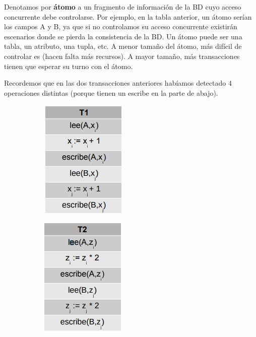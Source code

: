 Denotamos por \textbf{átomo} a un fragmento de información de la BD  cuyo acceso concurrente debe controlarse. Por ejemplo, en la tabla anterior, un átomo serían los campos A y B, ya que si no controlamos su acceso concurrente existirán escenarios donde se pierda la consistencia de la BD. Un átomo puede ser una tabla, un atributo, una tupla, etc. A menor tamaño del átomo, más difícil de controlar es (hacen falta más recursos). A mayor tamaño, más transacciones tienen que esperar su turno con el átomo.

Recordemos que en las dos transacciones anteriores habíamos detectado 4 operaciones distintas (porque tienen un escribe en la parte de abajo).

\begin{figure}[H]
\centering
\begin{subfigure}{.5\textwidth}
  \centering
  \includegraphics[width=.4\linewidth]{img/25.png}
\end{subfigure}%
\begin{subfigure}{.5\textwidth}
  \centering
  \includegraphics[width=.4\linewidth]{img/26.png}
\end{subfigure}
\end{figure}

